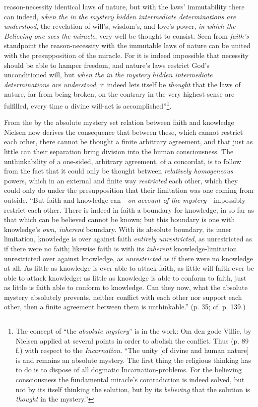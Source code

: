 \documentclass[12pt,a4paper]{book}
\begin{document}
reason-necessity identical laws of nature, but with the laws' immutability there can indeed, \emph{when the
in the mystery hidden intermediate determinations are understood}, the revelation of will's,
wisdom's, and love's power, \emph{in which the Believing one sees the miracle}, very well be thought to
consist. Seen from \emph{faith's} standpoint the reason-necessity with the immutable laws of nature can
be united with the presupposition of the miracle. For it is indeed impossible that necessity should be
able to hamper freedom, and nature's laws restrict God's unconditioned will, but \emph{when the in the mystery
hidden intermediate determinations are understood}, it indeed lets itself be \emph{thought} that the laws
of nature, far from being broken, on the contrary in the very highest sense are fulfilled, every time a
divine will-act is accomplished''\footnote{The concept of ``the \emph{absolute mystery}'' is in the work: Om
den gode Villie, by Nielsen applied at several points in order to abolish the conflict. Thus (p. 89 f.)
with respect to the \emph{Incarnation}. ``The unity [of divine and human nature] is and remains an absolute
mystery. The first thing the religious thinking has to do is to dispose of all dogmatic
Incarnation-problems. For the believing consciousness the fundamental miracle's contradiction is indeed
solved, but not by its itself thinking the solution, but by its \emph{believing} that the solution is \emph{thought} in
the mystery.''}.

From the by the absolute mystery set relation between faith and knowledge Nielsen now derives the
consequence that between these, which cannot restrict each other, there cannot be thought a finite
arbitrary agreement, and that just as little can their separation bring division into the human
consciousness. The unthinkability of a one-sided, arbitrary agreement, of a concordat, is to follow
from the fact that it could only be thought between \emph{relatively homogeneous} powers, which in an
external and finite way \emph{restricted} each other, which they could only do under the presupposition that
their limitation was one coming from outside. ``But faith and knowledge can---\emph{on account of the
mystery}---impossibly restrict each other. There is indeed in faith a boundary for knowledge, in so far
as that which can be believed cannot be known; but this boundary is one with knowledge's \emph{own, inherent}
boundary. With its absolute boundary, its inner limitation, knowledge is over against faith \emph{entirely
unrestricted}, as unrestricted as if there were no faith; likewise faith is with its \emph{inherent}
knowledge-limitation unrestricted over against knowledge, as \emph{unrestricted} as if there were no knowledge
at all. As little as knowledge is ever able to attack faith, as little will faith ever be able to attack
knowledge: as little as knowledge is able to conform to faith, just as little is faith able to conform
to knowledge. Can they now, what the absolute mystery absolutely prevents, neither conflict with each
other nor support each other, then a finite agreement between them is unthinkable.'' (p. 35; cf. p. 139.)
\end{document}
